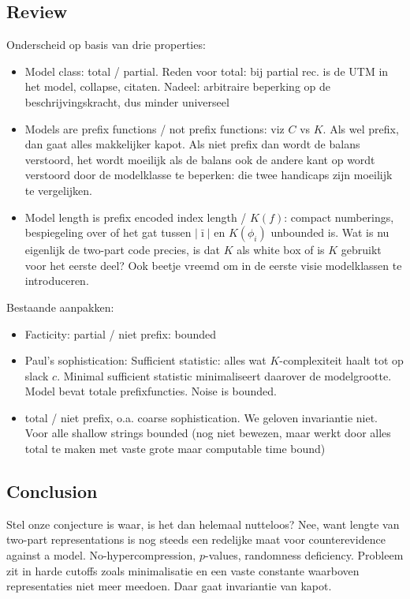 \documentclass{style/llncs}
\begin{document}
\subsection{Review}
Onderscheid op basis van drie properties:
\begin{itemize}
\item Model class: total / partial. Reden voor total: bij partial rec. is de UTM in het model, collapse, citaten. Nadeel: arbitraire beperking op de beschrijvingskracht, dus minder universeel
\item Models are prefix functions / not prefix functions: viz $C$ vs $K$. Als wel prefix, dan gaat alles makkelijker kapot. Als niet prefix dan wordt de balans verstoord, het wordt moeilijk als de balans ook de andere kant op wordt verstoord door de modelklasse te beperken: die twee handicaps zijn moeilijk te vergelijken.
\item Model length is prefix encoded index length / $K(f)$: compact numberings, bespiegeling over of het gat tussen $|\bar\imath|$ en $K(\phi_i)$ unbounded is. Wat is nu eigenlijk de two-part code precies, is dat $K$ als white box of is $K$ gebruikt voor het eerste deel? Ook beetje vreemd om in de eerste visie modelklassen te introduceren.
\end{itemize}

Bestaande aanpakken:
\begin{itemize}

\item Facticity: partial / niet prefix: bounded

\item Paul's sophistication: Sufficient statistic: alles wat $K$-complexiteit haalt tot op slack $c$. Minimal sufficient statistic minimaliseert daarover de modelgrootte. Model bevat totale prefixfuncties. Noise is bounded.

\item total / niet prefix, o.a. coarse sophistication. We geloven invariantie niet. Voor alle shallow strings bounded (nog niet bewezen, maar werkt door alles total te maken met vaste grote maar computable time bound)

\end{itemize}

\subsection{Conclusion}
Stel onze conjecture is waar, is het dan helemaal nutteloos? Nee, want lengte van two-part representations is nog steeds een redelijke maat voor counterevidence against a model. No-hypercompression, $p$-values, randomness deficiency. Probleem zit in harde cutoffs zoals minimalisatie en een vaste constante waarboven representaties niet meer meedoen. Daar gaat invariantie van kapot.
\end{document}
